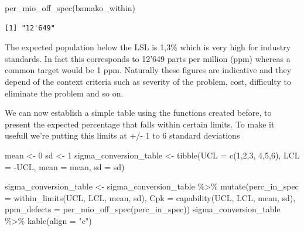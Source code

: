 \documentclass[
]{book}
\newenvironment{Shaded}{\begin{snugshade}}{\end{snugshade}}
\newcommand{\AttributeTok}[1]{\textcolor[rgb]{0.77,0.63,0.00}{#1}}
\newcommand{\DecValTok}[1]{\textcolor[rgb]{0.00,0.00,0.81}{#1}}
\newcommand{\FunctionTok}[1]{\textcolor[rgb]{0.00,0.00,0.00}{#1}}
\newcommand{\NormalTok}[1]{#1}
\newcommand{\OtherTok}[1]{\textcolor[rgb]{0.56,0.35,0.01}{#1}}
\newcommand{\SpecialCharTok}[1]{\textcolor[rgb]{0.00,0.00,0.00}{#1}}
\newcommand{\StringTok}[1]{\textcolor[rgb]{0.31,0.60,0.02}{#1}}
\begin{document}
\begin{Shaded}
\begin{Highlighting}[]
\FunctionTok{per\_mio\_off\_spec}\NormalTok{(bamako\_within)}
\end{Highlighting}
\end{Shaded}

\begin{verbatim}
[1] "12'649"
\end{verbatim}

The expected population below the LSL is 1,3\% which is very high for industry standards. In fact this corresponds to 12'649 parts per million (ppm) whereas a common target would be 1 ppm. Naturally these figures are indicative and they depend of the context criteria such as severity of the problem, cost, difficulty to eliminate the problem and so on.

We can now establish a simple table using the functions created before, to present the expected percentage that falls within certain limits. To make it usefull we're putting this limits at +/- 1 to 6 standard deviations

\begin{Shaded}
\begin{Highlighting}[]
\NormalTok{mean }\OtherTok{\textless{}{-}} \DecValTok{0}
\NormalTok{sd }\OtherTok{\textless{}{-}} \DecValTok{1}
\NormalTok{sigma\_conversion\_table }\OtherTok{\textless{}{-}} 
  \FunctionTok{tibble}\NormalTok{(}\AttributeTok{UCL =} \FunctionTok{c}\NormalTok{(}\DecValTok{1}\NormalTok{,}\DecValTok{2}\NormalTok{,}\DecValTok{3}\NormalTok{, }\DecValTok{4}\NormalTok{,}\DecValTok{5}\NormalTok{,}\DecValTok{6}\NormalTok{),}
         \AttributeTok{LCL =} \SpecialCharTok{{-}}\NormalTok{UCL,}
         \AttributeTok{mean =}\NormalTok{ mean,}
         \AttributeTok{sd =}\NormalTok{ sd)}
\end{Highlighting}
\end{Shaded}

\begin{Shaded}
\begin{Highlighting}[]
\NormalTok{sigma\_conversion\_table }\OtherTok{\textless{}{-}}\NormalTok{ sigma\_conversion\_table }\SpecialCharTok{\%\textgreater{}\%}
  \FunctionTok{mutate}\NormalTok{(}\AttributeTok{perc\_in\_spec =} \FunctionTok{within\_limits}\NormalTok{(UCL, LCL, mean, sd),}
         \AttributeTok{Cpk =} \FunctionTok{capability}\NormalTok{(UCL, LCL, mean, sd),}
         \AttributeTok{ppm\_defects =} \FunctionTok{per\_mio\_off\_spec}\NormalTok{(perc\_in\_spec))}
\NormalTok{sigma\_conversion\_table }\SpecialCharTok{\%\textgreater{}\%}
  \FunctionTok{kable}\NormalTok{(}\AttributeTok{align =} \StringTok{"c"}\NormalTok{)}
\end{Highlighting}
\end{Shaded}
\end{document}

